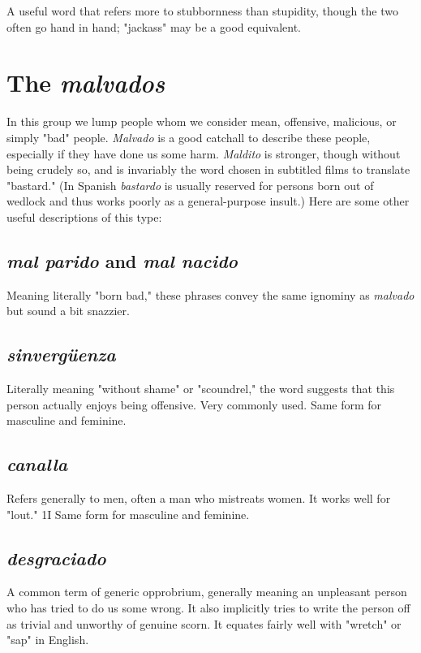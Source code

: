 \documentclass[14pt,a4paper,oneside]{memoir}
\begin{document}
A useful word that refers more to stubbornness than
stupidity, though the two often go hand in hand; "jackass" may be a
good equivalent.

\section{The \emph{malvados}}

In this group we lump people whom we consider mean, offensive, malicious, or simply "bad" people. \emph{Malvado} is a good catchall to
describe these people, especially if they have done us some harm. \emph{Maldito} is stronger, though without being crudely so, and is invariably the
word chosen in subtitled films to translate "bastard." (In Spanish \emph{bastardo} is usually reserved for persons born out of wedlock and thus
works poorly as a general-purpose insult.) Here are some other useful
descriptions of this type:

\subsection{\emph{mal parido} and \emph{mal nacido}}

Meaning literally "born bad,"
these phrases convey the same ignominy as \emph{malvado} but sound a bit
snazzier.

\subsection{\emph{sinvergüenza}}

Literally meaning "without shame" or
"scoundrel," the word suggests that this person actually enjoys being
offensive. Very commonly used. Same form for masculine and feminine.

\subsection{\emph{canalla}}

Refers generally to men, often a man who mistreats women. It works well for "lout." 1I Same form for masculine and
feminine.

\subsection{\emph{desgraciado}}

A common term of generic opprobrium, generally meaning an unpleasant person who has tried to do us some
wrong. It also implicitly tries to write the person off as trivial and unworthy of genuine scorn. It equates fairly well with "wretch" or "sap"
in English.
\end{document}

